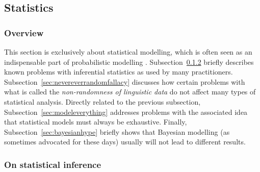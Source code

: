 
\subsection{Statistics}
\label{sec:statistics}

\subsubsection{Overview}
\label{sec:methods:overview}

This section is exclusively about statistical modelling, which is often seen as an indispensable part of probabilistic modelling \citep{Gries2017b}.
Subsection~\ref{sec:onstatisticalinference} briefly describes known problems with inferential statistics as used by many practitioners.
Subsection~\ref{sec:nevereverrandomfallacy} discusses how certain problems with what is called the \textit{non-randomness of linguistic data} do not affect many types of statistical analysis.
Directly related to the previous subsection, Subsection~\ref{sec:modeleverything} addresses problems with the associated idea that statistical models must always be exhaustive.
Finally, Subsection~\ref{sec:bayesianhype} briefly shows that Bayesian modelling (as sometimes advocated for these days) usually will not lead to different results.


\subsubsection{On statistical inference}
\label{sec:onstatisticalinference}

